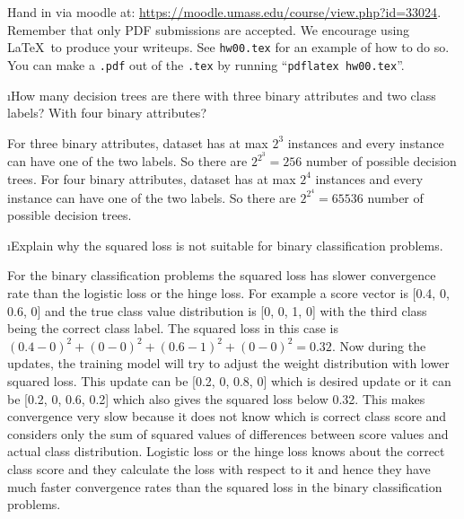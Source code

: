 \documentclass[fleqn]{article}
\begin{document}


Hand in via moodle at: \url{https://moodle.umass.edu/course/view.php?id=33024}.
Remember that only PDF submissions are accepted.  We encourage using
\LaTeX\ to produce your writeups.  See \verb+hw00.tex+ for an example
of how to do so.  You can make a \verb+.pdf+ out of the \verb+.tex+ by
running ``\verb+pdflatex hw00.tex+''.

\bee
\i How many decision trees are there with three binary attributes and two class labels? With four binary attributes? 
\begin{solution}
For three binary attributes, dataset has at max $2^3$ instances and every instance can have one of the two labels. So there are $2^{2^{3}} = 256$ number of possible decision trees.
For four binary attributes, dataset has at max $2^4$ instances and every instance can have one of the two labels. So there are $2^{2^{4}} = 65536$ number of possible decision trees.  
\end{solution}

\vspace{1.5in}


\i Explain why the squared loss is not suitable for binary classification problems.	
\begin{solution}
For the binary classification problems the squared loss has slower convergence rate than the logistic loss or the hinge loss. For example a score vector is [0.4, 0, 0.6, 0] and the true class value distribution is [0, 0, 1, 0] with the third class being the correct class label.
The squared loss in this case is $(0.4 - 0)^{2} + (0 - 0)^{2} + (0.6 - 1)^{2} + (0 - 0)^{2} = 0.32$. Now during the updates, the training model will try to adjust the weight distribution with lower squared loss. This update can be [0.2, 0, 0.8, 0] which is  desired update or it can be [0.2, 0, 0.6, 0.2] which also gives the squared loss below 0.32. This makes convergence very slow because it does not know which is correct class score and considers only the sum of squared values of differences between score values and actual class distribution. Logistic loss or the hinge loss knows about the correct class score and they calculate the loss with respect to it and hence they have much faster convergence rates than the squared loss in the binary classification problems.    
\end{solution}
\vspace{1.5in}
\end{document}
